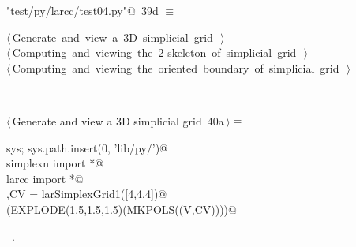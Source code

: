 \documentclass[11pt,oneside]{article}	%
\begin{document}
\begin{flushleft} \small
\begin{minipage}{\linewidth} \label{scrap79}
\protect{}\verb@"test/py/larcc/test04.py"@\nobreak\ {\footnotesize 39d }$\equiv$
\vspace{-1ex}
\begin{list}{}{} \item
\mbox{}\verb@@\hbox{$\langle\,$Generate and view a 3D simplicial grid\nobreak\ {\footnotesize {}}$\,\rangle$}\verb@@\\
\mbox{}\verb@@\hbox{$\langle\,$Computing and viewing the 2-skeleton of simplicial grid\nobreak\ {\footnotesize {}}$\,\rangle$}\verb@@\\
\mbox{}\verb@@\hbox{$\langle\,$Computing and viewing the oriented boundary of simplicial grid\nobreak\ {\footnotesize {}}$\,\rangle$}\verb@@\\
\mbox{}\verb@@{\NWsep}
\end{list}
\vspace{-2ex}
\end{minipage}\\[4ex]
\end{flushleft}


\begin{flushleft} \small \label{scrap80}
\protect{}$\langle\,$Generate and view a 3D simplicial grid\nobreak\ {\footnotesize 40a}$\,\rangle\equiv$
\vspace{-1ex}
\begin{list}{}{} \item
\mbox{}\verb@import sys; sys.path.insert(0, 'lib/py/')@\\
\mbox{}\verb@from simplexn import *@\\
\mbox{}\verb@from larcc import *@\\
\mbox{}\verb@V,CV = larSimplexGrid1([4,4,4])@\\
\mbox{}\verb@VIEW(EXPLODE(1.5,1.5,1.5)(MKPOLS((V,CV))))@\\
\mbox{}\verb@@{\NWsep}
\end{list}
\vspace{-1ex}
\footnotesize\addtolength{\baselineskip}{-1ex}
\begin{list}{}{\setlength{\itemsep}{-\parsep}\setlength{\itemindent}{-\leftmargin}}
\item \NWtxtMacroRefIn\ .
\end{list}
\end{flushleft}
\end{document}
